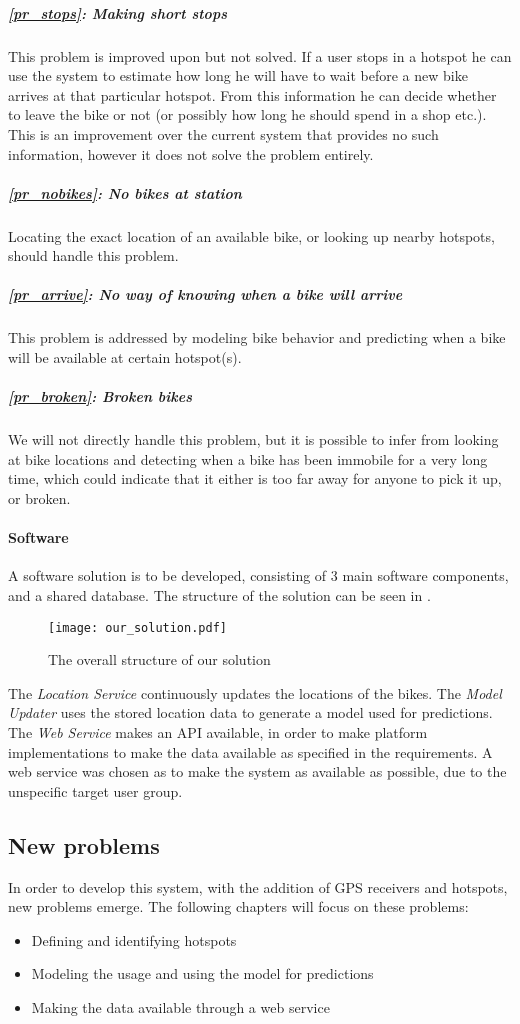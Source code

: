 \subparagraph{\ref{pr_stops}: Making short stops} This problem is improved upon but not solved.
If a user stops in a hotspot he can use the system to estimate how long he will have to wait before a new bike arrives at that particular hotspot.
From this information he can decide whether to leave the bike or not (or possibly how long he should spend in a shop etc.).
This is an improvement over the current system that provides no such information, however it does not solve the problem entirely.

\subparagraph{\ref{pr_nobikes}: No bikes at station} Locating the exact location of an available bike, or looking up nearby hotspots, should handle this problem.

\subparagraph{\ref{pr_arrive}: No way of knowing when a bike will arrive} This problem is addressed by modeling bike behavior and predicting when a bike will be available at certain hotspot(s).

\subparagraph{\ref{pr_broken}: Broken bikes} We will not directly handle this problem, but it is possible to infer from looking at bike locations and detecting when a bike has been immobile for a very long time, which could indicate that it either is too far away for anyone to pick it up, or broken.
\paragraph{Software}
A software solution is to be developed, consisting of 3 main software components, and a shared database.
The structure of the solution can be seen in .

\begin{figure}[h]
\texttt{[image: our\_solution.pdf]}
\caption{The overall structure of our solution}
\label{fig:solution_structure}
\end{figure}

The \textit{Location Service} continuously updates the locations of the bikes.
The \textit{Model Updater} uses the stored location data to generate a model used for predictions.
The \textit{Web Service} makes an API available, in order to make platform implementations to make the data available as specified in the requirements.
A web service was chosen as to make the system as available as possible, due to the unspecific target user group.

\subsection{New problems} \label{new_problems}
In order to develop this system, with the addition of GPS receivers and hotspots, new problems emerge.
The following chapters will focus on these problems:

\begin{itemize}
\item Defining and identifying hotspots
\item Modeling the usage and using the model for predictions
\item Making the data available through a web service
\end{itemize}
